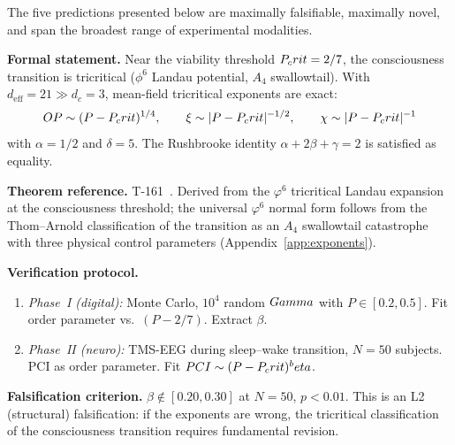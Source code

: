 The five predictions presented below are maximally falsifiable, maximally
novel, and span the broadest range of experimental modalities.

\begin{predictionbox}
\textbf{Formal statement.}
Near the viability threshold $P_crit = 2/7$, the consciousness transition is tricritical
($\phi^6$ Landau potential, $A_4$ swallowtail). With $d_{\mathrm{eff}} = 21 \gg d_c = 3$,
mean-field tricritical exponents are exact:
\begin{equation}
  OP \sim (P - P_crit)^{1/4}, \qquad
  \xi \sim |P - P_crit|^{-1/2}, \qquad
  \chi \sim |P - P_crit|^{-1}
\end{equation}
with $\alpha = 1/2$ and $\delta = 5$. The Rushbrooke identity $\alpha + 2\beta + \gamma = 2$ is satisfied as equality.

\medskip\noindent
\textbf{Theorem reference.} T-161~. Derived from the $\varphi^{6}$
tricritical Landau expansion at the consciousness threshold; the universal
$\varphi^{6}$ normal form follows from the Thom--Arnold classification of
the transition as an $A_4$ swallowtail catastrophe with three physical
control parameters (Appendix~\ref{app:exponents}).

\medskip\noindent
\textbf{Verification protocol.}
\begin{enumerate}[leftmargin=2em,nosep]
  \item \emph{Phase~I (digital):} Monte Carlo, $10^4$ random $Gamma$ with $P \in [0.2, 0.5]$.
        Fit order parameter vs.\ $(P - 2/7)$. Extract $\beta$.
  \item \emph{Phase~II (neuro):} TMS-EEG during sleep--wake transition, $N = 50$ subjects.
        PCI as order parameter. Fit $PCI \sim (P - P_crit)^beta$.
\end{enumerate}

\medskip\noindent
\textbf{Falsification criterion.}
$\beta \notin [0.20, 0.30]$ at $N = 50$, $p < 0.01$. This is an L2 (structural) falsification:
if the exponents are wrong, the tricritical classification of the consciousness transition requires fundamental revision.
\end{predictionbox}

